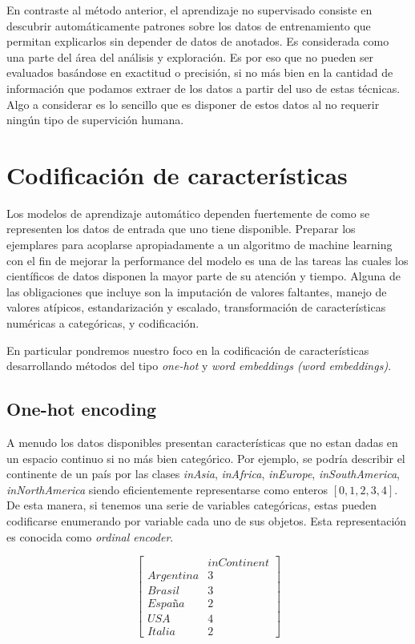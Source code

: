 En contraste al método anterior, el aprendizaje no supervisado consiste en
descubrir automáticamente patrones sobre los datos de entrenamiento que permitan
explicarlos sin depender de datos de anotados. Es considerada como una parte del
área del análisis y exploración. Es por eso que no pueden ser evaluados
basándose en exactitud o precisión, si no más bien en la cantidad de información
que podamos extraer de los datos a partir del uso de estas técnicas. Algo a
considerar es lo sencillo que es disponer de estos datos al no requerir ningún
tipo de supervición humana.

\section{Codificación de características}

Los modelos de aprendizaje automático dependen fuertemente de como se
representen los datos de entrada que uno tiene disponible. Preparar los
ejemplares para acoplarse apropiadamente a un algoritmo de machine learning con
el fin de mejorar la performance del modelo es una de las tareas las cuales los
científicos de datos disponen la mayor parte de su atención y tiempo. Alguna de
las obligaciones que incluye son la imputación de valores faltantes, manejo de
valores atípicos, estandarización y escalado, transformación de características
numéricas a categóricas, y codificación.

En particular pondremos nuestro foco en la codificación de características
desarrollando métodos del tipo \emph{one-hot} y \emph{word embeddings (word
embeddings)}.

\subsection{One-hot encoding}

A menudo los datos disponibles presentan características que no estan dadas en
un espacio continuo si no más bien categórico. Por ejemplo, se podría describir
el continente de un país por las clases \emph{inAsia}, \emph{inAfrica},
\emph{inEurope}, \emph{inSouthAmerica}, \emph{inNorthAmerica} siendo
eficientemente representarse como enteros $[0, 1, 2, 3, 4]$. De esta manera, si
tenemos una serie de variables categóricas, estas pueden codificarse enumerando
por variable cada uno de sus objetos. Esta representación es conocida como
\emph{ordinal encoder}.

\begin{equation*}
    \begin{bmatrix}
         & inContinent\\
        Argentina & 3 \\
        Brasil & 3 \\
        España & 2 \\
        USA & 4  \\
        Italia & 2 
    \end{bmatrix}
\end{equation*}

